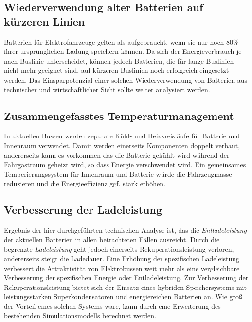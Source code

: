 \subsection{Wiederverwendung alter Batterien auf kürzeren Linien}
Batterien für Elektrofahrzeuge gelten als aufgebraucht, wenn sie nur noch 80\% ihrer ursprünglichen Ladung speichern können. Da sich der Energieverbrauch je nach Buslinie unterscheidet, können jedoch Batterien, die für lange Buslinien nicht mehr geeignet sind, auf kürzeren Buslinien noch erfolgreich eingesetzt werden. Das Einsparpotenzial einer solchen Wiederverwendung von Batterien aus technischer und wirtschaftlicher Sicht sollte weiter analysiert werden.

\subsection{Zusammengefasstes Temperaturmanagement}
In aktuellen Bussen werden separate Kühl- und Heizkreisläufe für Batterie und Innenraum verwendet. Damit werden einerseits Komponenten doppelt verbaut, andererseits kann es vorkommen das die Batterie gekühlt wird während der Fahrgastraum geheizt wird, so dass Energie verschwendet wird. Ein gemeinsames Temperierungssystem für Innenraum und Batterie würde die Fahrzeugmasse reduzieren und die Energieeffizienz ggf. stark erhöhen.

\subsection{Verbesserung der Ladeleistung}
Ergebnis der hier durchgeführten technischen Analyse ist, das die \emph{Entladeleistung} der aktuellen Batterien in allen betrachteten Fällen ausreicht. Durch die begrenzte \emph{Ladeleistung} geht jedoch einerseits Rekuperationsleistung verloren, andererseits steigt die Ladedauer. Eine Erhöhung der spezifischen Ladeleistung verbessert die Attraktivität von Elektrobussen weit mehr als eine vergleichbare Verbesserung der spezifischen Energie oder Entladeleistung. Zur Verbesserung der Rekuperationsleistung bietet sich der Einsatz eines hybriden Speichersystems mit leistungsstarken Superkondensatoren und energiereichen Batterien an. Wie groß der Vorteil eines solchen Systems wäre, kann durch eine Erweiterung des bestehenden Simulationsmodells berechnet werden.